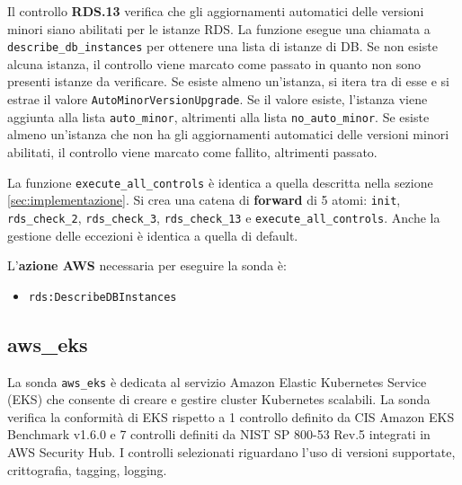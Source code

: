 Il controllo \textbf{RDS.13} verifica che gli aggiornamenti automatici delle versioni minori siano abilitati per le istanze RDS. La funzione esegue una chiamata a \texttt{describe\_db\_instances} per ottenere una lista di istanze di DB. Se non esiste alcuna istanza, il controllo viene marcato come passato in quanto non sono presenti istanze da verificare. Se esiste almeno un'istanza, si itera tra di esse e si estrae il valore \texttt{AutoMinorVersionUpgrade}. Se il valore esiste, l'istanza viene aggiunta alla lista \texttt{auto\_minor}, altrimenti alla lista \texttt{no\_auto\_minor}. Se esiste almeno un'istanza che non ha gli aggiornamenti automatici delle versioni minori abilitati, il controllo viene marcato come fallito, altrimenti passato.

La funzione \texttt{execute\_all\_controls} è identica a quella descritta nella sezione \ref{sec:implementazione}. Si crea una catena di \textbf{forward} di 5 atomi: \texttt{init}, \texttt{rds\_check\_2}, \texttt{rds\_check\_3}, \texttt{rds\_check\_13} e \texttt{execute\_all\_controls}. Anche la gestione delle eccezioni è identica a quella di default.

\vspace{1em}

\noindent L'\textbf{azione AWS} necessaria per eseguire la sonda è:
\begin{itemize}
    \item \texttt{rds:DescribeDBInstances}
\end{itemize}

\subsection{aws\_eks}
\label{sec:eks}

La sonda \texttt{aws\_eks} è dedicata al servizio Amazon Elastic Kubernetes Service (EKS) che consente di creare e gestire cluster Kubernetes scalabili. La sonda verifica la conformità di EKS rispetto a 1 controllo definito da CIS Amazon EKS Benchmark v1.6.0 e 7 controlli definiti da NIST SP 800-53 Rev.5 integrati in AWS Security Hub. I controlli selezionati riguardano l'uso di versioni supportate, crittografia, tagging, logging.

